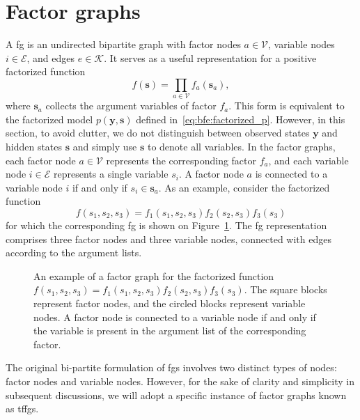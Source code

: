 \section{Factor graphs}\label{chapter-02:section:factor-graphs}

A \acf{fg} is an undirected bipartite graph with factor nodes $a \in \mathcal{V}$,
variable nodes $i \in \mathcal{E}$, and edges $e \in \mathcal{K}$.
It serves as a useful representation for a positive factorized function
\begin{equation}
\label{eq:ffg:factorization_assumption}
    f(\bm{s}) = \prod_{a \in \mathcal{V}}
    f_a(\bm{s}_a),
  \end{equation} 
where $\bm{s}_a$ collects the argument variables of factor $f_a$.
This form is equivalent to the factorized model $p(\bm{y}, \bm{s})$ defined in~\eqref{eq:bfe:factorized_p}.
However, in this section, to avoid clutter, we do not distinguish between observed states
$\bm{y}$ and hidden states $\bm{s}$ and simply use $\bm{s}$ to denote all variables.
In the factor graphs, each factor node $a \in \mathcal{V}$ represents the corresponding factor
$f_a$, and each variable node $i \in \mathcal{E}$ represents a single variable $s_i$.
A factor node $a$ is connected to a variable node $i$ if and only if $s_i \in \bm{s}_a$.
As an example, consider the factorized function \begin{equation}
  \label{eq:ffg:example1}
  f(s_1, s_2, s_3) = f_1(s_1, s_2, s_3)f_2(s_2, s_3)f_3(s_3)
\end{equation} for which the
corresponding \ac{fg} is shown on Figure~\ref{fig:ffg:example1}.
The \ac{fg} representation comprises three factor nodes and three variable nodes,
connected with edges according to the argument lists.

\begin{figure}
  \centering
  \resizebox{.75\textwidth}{!}{}
  \caption{An example of a factor graph for the factorized function $f(s_1, s_2, s_3) = f_1(s_1, s_2, s_3)f_2(s_2, s_3)f_3(s_3)$.
    The square blocks represent factor nodes, and the circled blocks represent variable nodes.
    A factor node is connected to a variable node if and only if the variable is present in the
    argument list of the corresponding factor.
  }
  \label{fig:ffg:example1}
\end{figure}

The original bi-partite formulation of \acp{fg} involves two distinct types of nodes:
factor nodes and variable nodes.
However, for the sake of clarity and simplicity in subsequent discussions, we will adopt a
specific instance of factor graphs known as \acp{tffg}.


